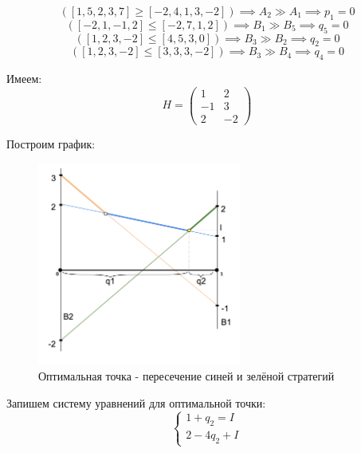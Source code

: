 \documentclass[a4paper,14pt]{extreport}
\begin{document}
\begin{equation*}
     ([1, 5, 2, 3, 7] \geq [-2, 4, 1, 3, -2]) \implies A_2 \gg A_1 \implies p_1 = 0
\end{equation*}
\begin{equation*}
    ([-2, 1, -1, 2] \leq [-2, 7, 1, 2]) \implies B_1 \gg B_5 \implies q_5 = 0
\end{equation*}
\begin{equation*}
    ([1, 2, 3, -2] \leq [4, 5, 3, 0]) \implies B_3 \gg B_2 \implies q_2 = 0
\end{equation*}
\begin{equation*}
    ([1, 2, 3, -2] \leq [3, 3, 3, -2]) \implies B_3 \gg B_4 \implies q_4 = 0
\end{equation*}

Имеем:
\begin{equation}
    H = \begin{pmatrix}
        1 & 2 \\
        -1 & 3 \\
        2 & -2
        \end{pmatrix}
\end{equation}

Построим график: \newpage

\begin{figure}[ht]
    \centering
    \includegraphics[width=0.6\textwidth]{plot.png}
    \caption{Оптимальная точка - пересечение синей и зелёной стратегий}
\end{figure}

Запишем систему уравнений для оптимальной точки:
\begin{equation}
\begin{cases}
    1 + q_2 = I \\
    2 - 4q_2 + I
\end{cases}
\end{equation}
\end{document}
